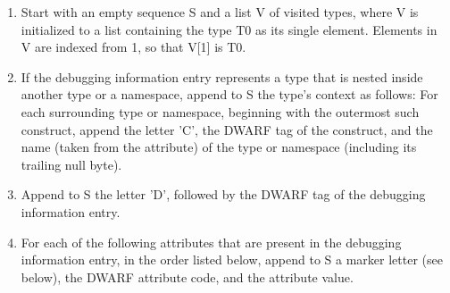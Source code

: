 \begin{enumerate}[1.]

\item Start with an empty sequence S and a list V of visited
types, where V is initialized to a list containing the type
T0 as its single element. Elements in V are indexed from 1,
so that V[1] is T0.

\item If the debugging information entry represents a type that
is nested inside another type or a namespace, append to S
the type’s context as follows: For each surrounding type
or namespace, beginning with the outermost such construct,
append the letter 'C', the DWARF tag of the construct, and
the name (taken from the  attribute) of the type
or namespace (including its trailing null byte).

\item  Append to S the letter 'D', followed by the DWARF tag of
the debugging information entry.

\item For each of the following attributes that are present in
the debugging information entry, in the order listed below,
append to S a marker letter (see below), the DWARF attribute
code, and the attribute value.


\end{enumerate}
